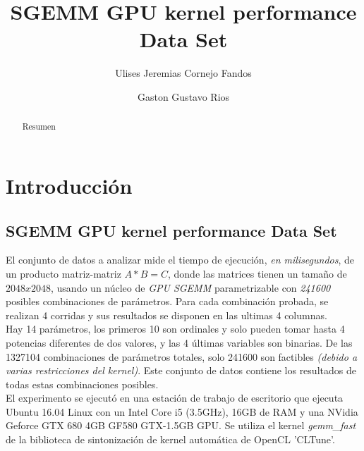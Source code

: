 \documentclass[osajnl,twocolumn,showpacs,superscriptaddress,10pt]{revtex4-1} %
\begin{document}
\title{SGEMM GPU kernel performance Data Set}

\author{Ulises Jeremias Cornejo Fandos}

\author{Gaston Gustavo Rios}


\begin{abstract}
Resumen
\end{abstract}

\maketitle %

\section{Introducción}

\subsection{SGEMM GPU kernel performance Data Set}

El conjunto de datos a analizar mide el tiempo de ejecución, \textit{en milisegundos}, de un producto matriz-matriz $A * B = C$, donde las matrices tienen un tamaño de $2048 x 2048$, usando un núcleo de \textit{GPU SGEMM} parametrizable con \textit{241600} posibles combinaciones de parámetros. Para cada combinación probada, se realizan 4 corridas y sus resultados se disponen en las ultimas 4 columnas. \\

Hay 14 parámetros, los primeros 10 son ordinales y solo pueden tomar hasta 4 potencias diferentes de dos valores, y las 4 últimas variables son binarias. De las 1327104 combinaciones de parámetros totales, solo 241600 son factibles \textit{(debido a varias restricciones del kernel)}. Este conjunto de datos contiene los resultados de todas estas combinaciones posibles. \\

El experimento se ejecutó en una estación de trabajo de escritorio que ejecuta Ubuntu 16.04 Linux con un Intel Core i5 (3.5GHz), 16GB de RAM y una NVidia Geforce GTX 680 4GB GF580 GTX-1.5GB GPU. Se utiliza el kernel \textit{gemm\_fast} de la biblioteca de sintonización de kernel automática de OpenCL 'CLTune'. \\
\end{document}
